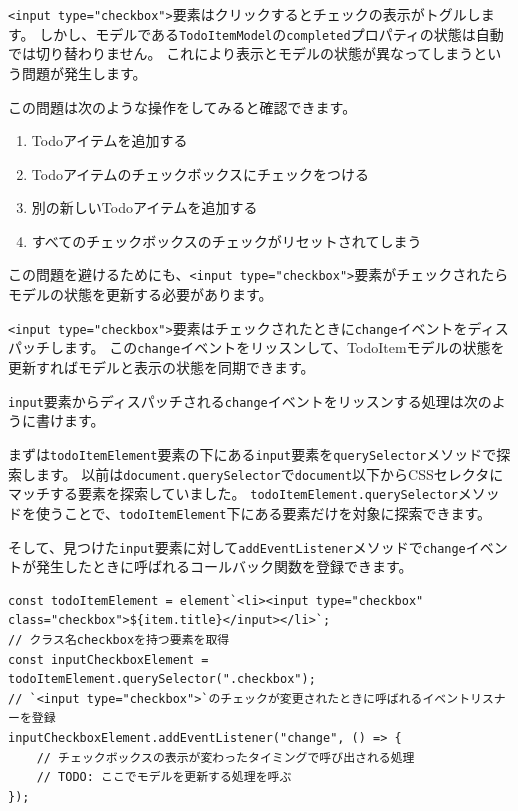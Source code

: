 \texttt{<input type="checkbox">}要素はクリックするとチェックの表示がトグルします。
しかし、モデルである\texttt{TodoItemModel}の\texttt{completed}プロパティの状態は自動では切り替わりません。
これにより表示とモデルの状態が異なってしまうという問題が発生します。

この問題は次のような操作をしてみると確認できます。

\begin{enumerate}
\def\labelenumi{\arabic{enumi}.}
\item
  Todoアイテムを追加する
\item
  Todoアイテムのチェックボックスにチェックをつける
\item
  別の新しいTodoアイテムを追加する
\item
  すべてのチェックボックスのチェックがリセットされてしまう
\end{enumerate}

この問題を避けるためにも、\texttt{<input type="checkbox">}要素がチェックされたらモデルの状態を更新する必要があります。

\texttt{<input type="checkbox">}要素はチェックされたときに\texttt{change}イベントをディスパッチします。
この\texttt{change}イベントをリッスンして、TodoItemモデルの状態を更新すればモデルと表示の状態を同期できます。

\texttt{input}要素からディスパッチされる\texttt{change}イベントをリッスンする処理は次のように書けます。

まずは\texttt{todoItemElement}要素の下にある\texttt{input}要素を\texttt{querySelector}メソッドで探索します。
以前は\texttt{document.querySelector}で\texttt{document}以下からCSSセレクタにマッチする要素を探索していました。
\texttt{todoItemElement.querySelector}メソッドを使うことで、\texttt{todoItemElement}下にある要素だけを対象に探索できます。

そして、見つけた\texttt{input}要素に対して\texttt{addEventListener}メソッドで\texttt{change}イベントが発生したときに呼ばれるコールバック関数を登録できます。

\begin{lstlisting}
const todoItemElement = element`<li><input type="checkbox" class="checkbox">${item.title}</input></li>`;
// クラス名checkboxを持つ要素を取得
const inputCheckboxElement = todoItemElement.querySelector(".checkbox");
// `<input type="checkbox">`のチェックが変更されたときに呼ばれるイベントリスナーを登録
inputCheckboxElement.addEventListener("change", () => {
    // チェックボックスの表示が変わったタイミングで呼び出される処理
    // TODO: ここでモデルを更新する処理を呼ぶ
});
\end{lstlisting}

